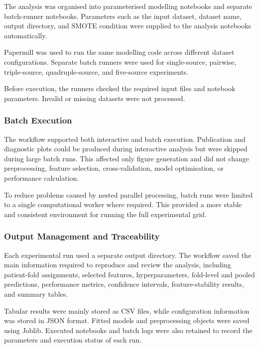 \documentclass[12pt,twocolumn]{article}
\begin{document}
The analysis was organised into parameterised modelling notebooks and
separate batch-runner notebooks. Parameters such as the input dataset,
dataset name, output directory, and SMOTE condition were supplied to
the analysis notebooks automatically.

Papermill was used to run the same modelling code across different
dataset configurations. Separate batch runners were used for
single-source, pairwise, triple-source, quadruple-source, and
five-source experiments.

Before execution, the runners checked the required input files and
notebook parameters. Invalid or missing datasets were not processed.

\subsubsection{Batch Execution}
\label{subsubsec:batch_safe_execution}

The workflow supported both interactive and batch execution.
Publication and diagnostic plots could be produced during interactive
analysis but were skipped during large batch runs. This affected only
figure generation and did not change preprocessing, feature selection,
cross-validation, model optimisation, or performance calculation.

To reduce problems caused by nested parallel processing, batch runs
were limited to a single computational worker where required. This
provided a more stable and consistent environment for running the full
experimental grid.

\subsubsection{Output Management and Traceability}
\label{subsubsec:output_management}

Each experimental run used a separate output directory. The workflow
saved the main information required to reproduce and review the
analysis, including patient-fold assignments, selected features,
hyperparameters, fold-level and pooled predictions, performance
metrics, confidence intervals, feature-stability results, and summary
tables.

Tabular results were mainly stored as CSV files, while configuration
information was stored in JSON format. Fitted models and preprocessing
objects were saved using Joblib. Executed notebooks and batch logs were
also retained to record the parameters and execution status of each
run.
\end{document}
